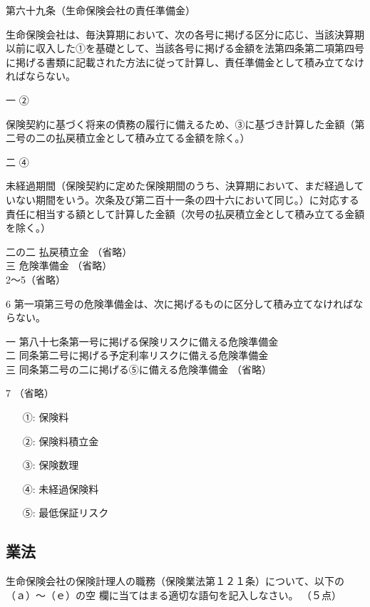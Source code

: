 \documentclass[report,gutter=10mm,fore-edge=10mm,uplatex,dvipdfmx]{jlreq}
\begin{document}
第六十九条（生命保険会社の責任準備金）

生命保険会社は、毎決算期において、次の各号に掲げる区分に応じ、当該決算期以前に収入した①を基礎として、当該各号に掲げる金額を法第四条第二項第四号に掲げる書類に記載された方法に従って計算し、責任準備金として積み立てなければならない。

一 ②

保険契約に基づく将来の債務の履行に備えるため、③に基づき計算した金額（第二号の二の払戻積立金として積み立てる金額を除く。）

二 ④

未経過期間（保険契約に定めた保険期間のうち、決算期において、まだ経過していない期間をいう。次条及び第二百十一条の四十六において同じ。）に対応する責任に相当する額として計算した金額（次号の払戻積立金として積み立てる金額を除く。）

二の二 払戻積立金 （省略）\\
三 危険準備金 （省略）\\
2〜5（省略）

6 第一項第三号の危険準備金は、次に掲げるものに区分して積み立てなければならない。

一 第八十七条第一号に掲げる保険リスクに備える危険準備金\\
二 同条第二号に掲げる予定利率リスクに備える危険準備金\\
三 同条第二号の二に掲げる⑤に備える危険準備金
（省略）

7 （省略）
\answer{}

\begin{itemize}
\item[ ①:] 保険料
\item[ ②:] 保険料積立金
\item[ ③:] 保険数理
\item[ ④:] 未経過保険料
\item[ ⑤:] 最低保証リスク
\end{itemize}


\subsection{業法}
生命保険会社の保険計理人の職務（保険業法第１２１条）について、以下の（ａ）～（ｅ）の空
欄に当てはまる適切な語句を記入しなさい。
（５点）
\end{document}
